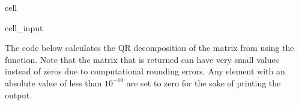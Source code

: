 \documentclass[letterpaper,10pt,english]{jupyterBook}
\begin{document}
\begin{sphinxuseclass}{cell}\begin{sphinxVerbatimInput}

\begin{sphinxuseclass}{cell_input}
\begin{sphinxVerbatim}[commandchars=\\\{\}]
 
       
        
       
              \PYG{p}{[}\PYG{p}{]}  
          \PYG{p}{[}\PYG{p}{[}\PYG{p}{]}\PYG{p}{]}
            \PYG{p}{[}\PYG{p}{]}    
            
          
        \PYG{p}{[}\PYG{p}{]}         
           
           
    
      
\end{sphinxVerbatim}

\end{sphinxuseclass}\end{sphinxVerbatimInput}

\end{sphinxuseclass}
\sphinxAtStartPar
The code below calculates the QR decomposition of the matrix from {\hyperref[\detokenize{6_Direct_methods/6.4_QR_decomposition:qr-householder-example}]{}} using the  function. Note that the  matrix that is returned can have very small values instead of zeros due to computational rounding errors. Any element with an absolute value of less than \(10^{-10}\) are set to zero for the sake of printing the output.
\end{document}
